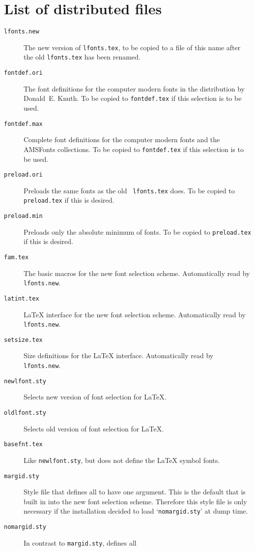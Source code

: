  \section{List of distributed files}

 \begin{description}
  \item[\tt lfonts.new]
   The new version of {\tt lfonts.tex}, to be copied to a file of
   this name after the old {\tt lfonts.tex} has been renamed.
  \item[\tt fontdef.ori]
   The font definitions for the computer modern fonts in the
   distribution by
   Donald~E. Knuth.  To be copied to {\tt fontdef.tex} if this
   selection is to be used.
  \item[\tt fontdef.max]
   Complete font definitions for the computer modern fonts and the
   AMSFonts collections.  To be copied to {\tt fontdef.tex} if this
   selection is to be used.
  \item[\tt preload.ori]
   Preloads the same fonts as the old {\tt
   lfonts.tex} does.  To be copied
   to {\tt preload.tex} if this is desired.
  \item[\tt preload.min]
   Preloads only the absolute minimum of fonts.  To be copied
   to {\tt preload.tex} if this is desired.
  \item[\tt fam.tex]
   The basic macros for the new font selection scheme.
   Automatically read by {\tt lfonts.new}.
  \item[\tt latint.tex]
   \LaTeX{} interface for the new font selection scheme.
   Automatically read by {\tt lfonts.new}.
  \item[\tt setsize.tex]
   Size definitions for the \LaTeX{} interface.
   Automatically read by {\tt lfonts.new}.
  \item[\tt newlfont.sty]
   Selects new version of font selection for \LaTeX.
  \item[\tt oldlfont.sty]
   Selects old version of font selection for \LaTeX.
  \item[\tt basefnt.tex]
   Like {\tt newlfont.sty}, but does not define the \LaTeX{} symbol
   fonts.
  \item[\tt margid.sty]
   Style file that
   defines all  to have one argument.
   This is the default that is built in into the new font selection
   scheme.  Therefore this style file is only necessary if the
   installation decided to load `{\tt nomargid.sty}' at dump time.
  \item[\tt nomargid.sty]
   In contrast to {\tt margid.sty}, defines all

\end{description}

